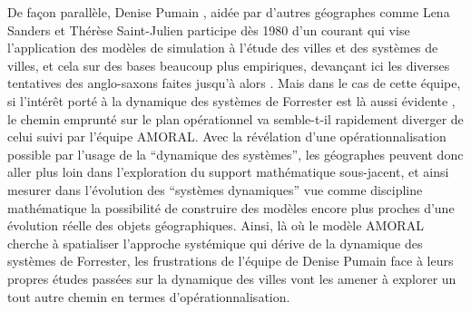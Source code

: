 
De façon parallèle, Denise Pumain , aidée par d'autres géographes comme Lena Sanders et Thérèse Saint-Julien participe dès 1980 d'un courant \autocites{Pumain1983, Pumain1984, Pumain1989} qui vise l'application des modèles de simulation à l'étude des villes et des systèmes de villes, et cela sur des bases beaucoup plus empiriques, devançant ici les diverses tentatives des anglo-saxons faites jusqu'à alors \autocite[99-100]{Pumain1989}. Mais dans le cas de cette équipe, si l’intérêt porté à la dynamique des systèmes de Forrester est là aussi évidente \autocites{Pumain1983, Pumain1984}, le chemin emprunté sur le plan opérationnel va semble-t-il rapidement diverger de celui suivi par l'équipe AMORAL. Avec la révélation d'une opérationnalisation possible par l'usage de la \enquote{dynamique des systèmes}, les géographes peuvent donc aller plus loin dans l'exploration du support mathématique sous-jacent, et ainsi mesurer dans l'évolution des \enquote{systèmes dynamiques} vue comme discipline mathématique la possibilité de construire des modèles encore plus proches d'une évolution réelle des objets géographiques. Ainsi, là où le modèle AMORAL cherche à spatialiser l'approche systémique qui dérive de la dynamique des systèmes de Forrester, les frustrations de l'équipe de Denise Pumain face à leurs propres études passées sur la dynamique des villes vont les amener à explorer un tout autre chemin en termes d'opérationnalisation.

